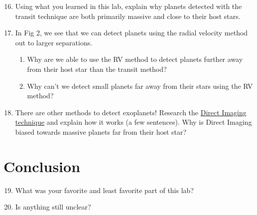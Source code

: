 \documentclass[12pt]{article}
\begin{document}
\begin{enumerate}
\setcounter{enumi}{15}
    \item Using what you learned in this lab, explain why planets detected with the transit technique are both primarily massive and close to their host stars. 
        
    \item In Fig 2, we see that we can detect planets using the radial velocity method out to larger separations.
    
    \begin{enumerate}
        \item  Why are we able to use the RV method to detect planets further away from their host star than the transit method? 
            
        \item Why can't we detect small planets far away from their stars using the RV method? 
            
    \end{enumerate}
    
    \item There are other methods to detect exoplanets! Research the  \href{https://en.wikipedia.org/wiki/Methods_of_detecting_exoplanets#Direct_imaging}{Direct Imaging technique} and explain how it works (a few sentences).  Why is Direct Imaging biased towards massive planets far from their host star?
    
\end{enumerate}

\section{Conclusion}
\begin{enumerate}
    \setcounter{enumi}{18}
    \item What was your favorite and least favorite part of this lab?
    \item Is anything still unclear?
\end{enumerate}
\end{document}
